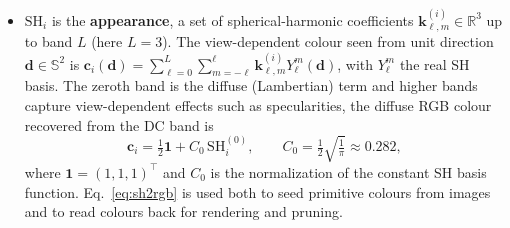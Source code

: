 \begin{itemize}
    \item $\mathrm{SH}_i$ is the \textbf{appearance}, a set of spherical-harmonic
    coefficients $\mathbf{k}_{\ell,m}^{(i)} \in \mathbb{R}^3$ up to band $L$ (here
    $L = 3$). The view-dependent colour seen from unit direction
    $\mathbf{d} \in \mathbb{S}^2$ is
    $\mathbf{c}_i(\mathbf{d}) = \sum_{\ell=0}^{L}\sum_{m=-\ell}^{\ell}
    \mathbf{k}_{\ell,m}^{(i)} Y_{\ell}^{m}(\mathbf{d})$, with $Y_\ell^m$ the
    real SH
    basis. The zeroth band is the diffuse (Lambertian) term and higher bands
    capture
    view-dependent effects such as specularities, the diffuse RGB colour recovered
    from the DC band is
    \begin{equation}
        \mathbf{c}_i = \tfrac{1}{2}\mathbf{1} + C_0\, \mathrm{SH}_i^{(0)},
        \qquad C_0 = \tfrac{1}{2}\sqrt{\tfrac{1}{\pi}} \approx 0.282,
        \label{eq:sh2rgb}
    \end{equation}
    where $\mathbf{1}=(1,1,1)^{\!\top}$ and $C_0$ is the normalization of the
    constant SH basis function. Eq.~\eqref{eq:sh2rgb} is used both to seed
    primitive colours from images and to read colours back for rendering and
    pruning.
\end{itemize}

